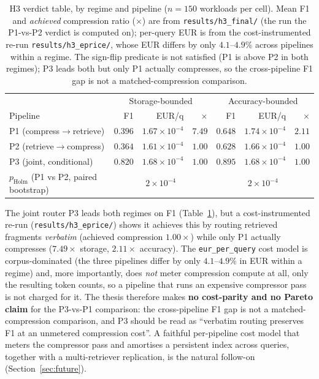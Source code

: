 \begin{table}[htbp]
\centering
\caption{H3 verdict table, by regime and pipeline ($n=150$ workloads
per cell). Mean F1 and \emph{achieved} compression ratio ($\times$)
are from \texttt{results/h3\_final/} (the run the P1-vs-P2 verdict is
computed on); per-query EUR is from the cost-instrumented re-run
\texttt{results/h3\_eprice/}, whose EUR differs by only $4.1$--$4.9\%$
across pipelines within a regime. The sign-flip predicate is not
satisfied (P1 is above P2 in both regimes); P3 leads both but only P1
actually compresses, so the cross-pipeline F1 gap is not a
matched-compression comparison.}
\label{tab:h3}
\small
\begin{tabular}{lrrr|rrr}
\hline
& \multicolumn{3}{c|}{Storage-bounded}
& \multicolumn{3}{c}{Accuracy-bounded} \\
Pipeline & F1 & EUR/q & $\times$ & F1 & EUR/q & $\times$ \\
\hline
P1 (compress$\to$retrieve) & $0.396$ & $1.67\times 10^{-4}$ & $7.49$ & $0.648$ & $1.74\times 10^{-4}$ & $2.11$ \\
P2 (retrieve$\to$compress) & $0.364$ & $1.61\times 10^{-4}$ & $1.00$ & $0.628$ & $1.66\times 10^{-4}$ & $1.00$ \\
P3 (joint, conditional)    & $\mathbf{0.820}$ & $1.68\times 10^{-4}$ & $1.00$ & $\mathbf{0.895}$ & $1.68\times 10^{-4}$ & $1.00$ \\
\hline
$p_\text{Holm}$ (P1 vs P2, paired bootstrap) & \multicolumn{3}{c|}{$2\!\times\!10^{-4}$} & \multicolumn{3}{c}{$2\!\times\!10^{-4}$} \\
\hline
\end{tabular}
\end{table}

The joint router P3 leads both regimes on F1
(Table~\ref{tab:h3}), but a cost-instrumented re-run
(\texttt{results/h3\_eprice/}) shows it achieves this by routing
retrieved fragments \emph{verbatim} (achieved compression
$1.00\times$) while only P1 actually compresses ($7.49\times$
storage, $2.11\times$ accuracy). The \texttt{eur\_per\_query} cost
model is corpus-dominated (the three pipelines differ by only
$4.1$--$4.9\%$ in EUR within a regime) and, more importantly, does
\emph{not} meter compression compute at all, only the resulting
token counts, so a pipeline that runs an expensive compressor pass
is not charged for it. The thesis therefore makes \textbf{no
cost-parity and no Pareto claim} for the P3-vs-P1 comparison: the
cross-pipeline F1 gap is not a matched-compression comparison, and
P3 should be read as ``verbatim routing preserves F1 at an unmetered
compression cost''. A faithful per-pipeline cost model that meters
the compressor pass and amortises a persistent index across queries,
together with a multi-retriever replication, is the natural
follow-on (Section~\ref{sec:future}).
